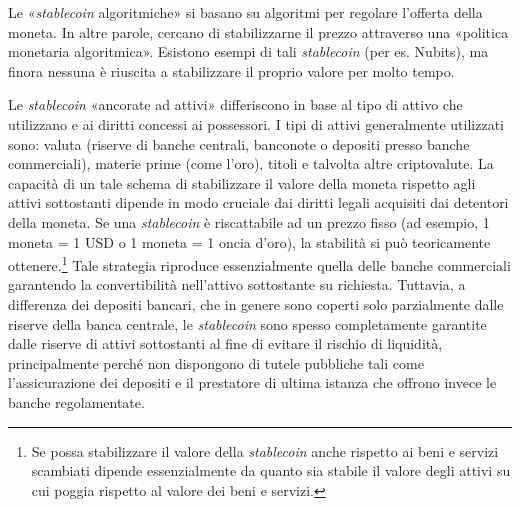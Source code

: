 \documentclass{article}
\begin{document}
Le «\textit{stablecoin} algoritmiche» si basano su algoritmi per regolare 
l'offerta della moneta. In altre parole, cercano di stabilizzarne il 
prezzo attraverso una «politica monetaria algoritmica». Esistono 
esempi di tali \textit{stablecoin} (per es. Nubits), ma finora nessuna è 
riuscita a stabilizzare il proprio valore per molto tempo.

Le \textit{stablecoin} «ancorate ad attivi» differiscono in base al tipo 
di attivo che utilizzano e ai diritti concessi ai possessori. I tipi di 
attivi generalmente utilizzati sono: valuta (riserve di banche centrali, 
banconote o depositi presso banche commerciali), materie prime (come 
l'oro), titoli e talvolta altre criptovalute. La capacità di un tale 
schema di stabilizzare il valore della moneta rispetto agli attivi 
sottostanti dipende in modo cruciale dai diritti legali acquisiti dai 
detentori della moneta. Se una \textit{stablecoin} è riscattabile ad un 
prezzo fisso (ad esempio, 1 moneta = 1 USD o 1 moneta = 1 oncia d'oro), 
la stabilità si può teoricamente ottenere.\footnote{Se possa stabilizzare 
il valore della \textit{stablecoin} anche rispetto ai beni e servizi 
scambiati dipende essenzialmente da quanto sia stabile il valore degli 
attivi su cui poggia rispetto al valore dei beni e servizi.} Tale strategia 
riproduce essenzialmente quella delle banche commerciali garantendo la 
convertibilità nell'attivo sottostante su richiesta. Tuttavia, a differenza 
dei depositi bancari, che in genere sono coperti solo parzialmente dalle 
riserve della banca centrale, le  \textit{stablecoin} sono spesso 
completamente garantite dalle riserve di attivi sottostanti al fine di 
evitare il rischio di liquidità, principalmente perché non dispongono di 
tutele pubbliche tali come l'assicurazione dei depositi e il prestatore 
di ultima istanza che offrono invece le banche regolamentate.
\end{document}
